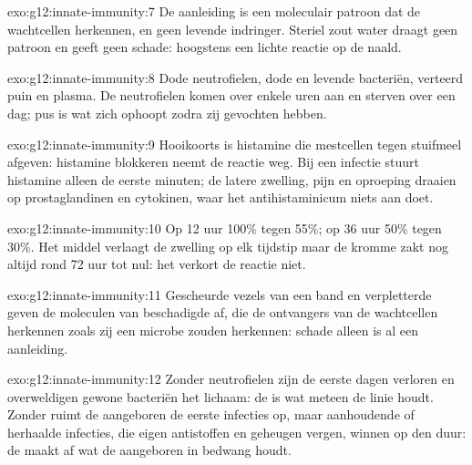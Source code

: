 \begin{solution}{exo:g12:innate-immunity:7}
De aanleiding is een moleculair patroon dat de wachtcellen herkennen, en
geen levende indringer. Steriel zout water draagt geen patroon en geeft
geen schade: hoogstens een lichte reactie op de naald.
\end{solution}

\begin{solution}{exo:g12:innate-immunity:8}
Dode neutrofielen, dode en levende bacteriën, verteerd puin en plasma. De
neutrofielen komen over enkele uren aan en sterven over een dag; pus is
wat zich ophoopt zodra zij gevochten hebben.
\end{solution}

\begin{solution}{exo:g12:innate-immunity:9}
Hooikoorts is histamine die mestcellen tegen stuifmeel afgeven: histamine
blokkeren neemt de reactie weg. Bij een infectie stuurt histamine alleen
de eerste minuten; de latere zwelling, pijn en oproeping draaien op
prostaglandinen en cytokinen, waar het antihistaminicum niets aan doet.
\end{solution}

\begin{solution}{exo:g12:innate-immunity:10}
Op 12 uur 100\% tegen 55\%; op 36 uur 50\% tegen 30\%. Het middel verlaagt
de zwelling op elk tijdstip maar de kromme zakt nog altijd rond 72 uur tot
nul: het verkort de reactie niet.
\end{solution}

\begin{solution}{exo:g12:innate-immunity:11}
Gescheurde vezels van een band en verpletterde  geven de moleculen
van beschadigde  af, die de ontvangers van de wachtcellen herkennen
zoals zij een microbe zouden herkennen: schade alleen is al een
aanleiding.
\end{solution}

\begin{solution}{exo:g12:innate-immunity:12}
Zonder neutrofielen zijn de eerste dagen verloren en overweldigen gewone
bacteriën het lichaam: de  is wat meteen de linie houdt.
Zonder  ruimt de aangeboren de eerste infecties op, maar
aanhoudende of herhaalde infecties, die eigen antistoffen en geheugen
vergen, winnen op den duur: de  maakt af wat de aangeboren
in bedwang houdt.
\end{solution}

